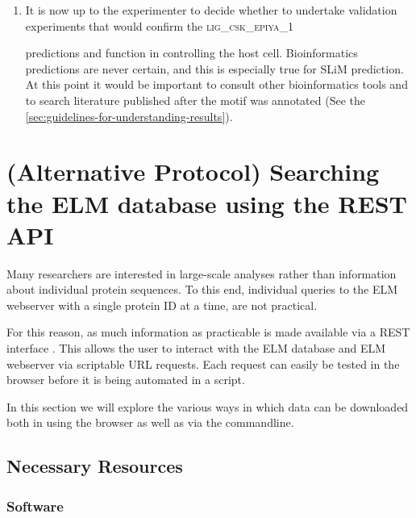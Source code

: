 \documentclass[12pt]{article}
\newcommand\motif[1]{%
    \textsc{\lowercase{#1}}%
}
\begin{document}
\begin{enumerate}
\item It is now up to the experimenter to decide whether to undertake
	validation experiments that would confirm the \motif{LIG\_CSK\_EPIYA\_1}
	predictions and function in controlling the host cell. Bioinformatics
	predictions are never certain, and this is especially true for SLiM
	prediction.  At this point it would be important to consult other
	bioinformatics tools and to search literature published after the motif
	was annotated
	(See the \ref{sec:guidelines-for-understanding-results}).

\end{enumerate}


%
%
\section{(Alternative Protocol) Searching the ELM database using the REST API}
\label{sec:search_REST}

Many researchers are interested in large-scale analyses rather than
information about individual protein sequences. To this end, individual
queries to the ELM webserver with a single protein ID at a time, are not
practical.

For this reason, as much information as practicable is made available via a
REST interface \citep{Fielding2002}. This allows the user to interact
with the ELM database and ELM webserver via scriptable URL requests.
Each request can easily be tested in the browser before it is being
automated in a script.

In this section we will explore the various ways in which data can be
downloaded both in using the browser as well as via the commandline.

%
%
\subsection*{Necessary Resources}
\subsubsection*{Software}

\end{document}
